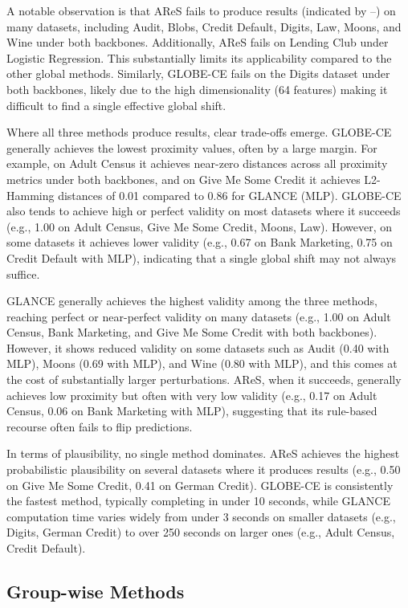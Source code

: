 \documentclass[runningheads]{llncs}
\begin{document}
A notable observation is that AReS fails to produce results (indicated by --) on many datasets, including Audit, Blobs, Credit Default, Digits, Law, Moons, and Wine under both backbones. Additionally, AReS fails on Lending Club under Logistic Regression. This substantially limits its applicability compared to the other global methods. Similarly, GLOBE-CE fails on the Digits dataset under both backbones, likely due to the high dimensionality (64 features) making it difficult to find a single effective global shift.

Where all three methods produce results, clear trade-offs emerge. GLOBE-CE generally achieves the lowest proximity values, often by a large margin. For example, on Adult Census it achieves near-zero distances across all proximity metrics under both backbones, and on Give Me Some Credit it achieves L2-Hamming distances of 0.01 compared to 0.86 for GLANCE (MLP). GLOBE-CE also tends to achieve high or perfect validity on most datasets where it succeeds (e.g., 1.00 on Adult Census, Give Me Some Credit, Moons, Law). However, on some datasets it achieves lower validity (e.g., 0.67 on Bank Marketing, 0.75 on Credit Default with MLP), indicating that a single global shift may not always suffice.

GLANCE generally achieves the highest validity among the three methods, reaching perfect or near-perfect validity on many datasets (e.g., 1.00 on Adult Census, Bank Marketing, and Give Me Some Credit with both backbones). However, it shows reduced validity on some datasets such as Audit (0.40 with MLP), Moons (0.69 with MLP), and Wine (0.80 with MLP), and this comes at the cost of substantially larger perturbations. AReS, when it succeeds, generally achieves low proximity but often with very low validity (e.g., 0.17 on Adult Census, 0.06 on Bank Marketing with MLP), suggesting that its rule-based recourse often fails to flip predictions.

In terms of plausibility, no single method dominates. AReS achieves the highest probabilistic plausibility on several datasets where it produces results (e.g., 0.50 on Give Me Some Credit, 0.41 on German Credit). GLOBE-CE is consistently the fastest method, typically completing in under 10 seconds, while GLANCE computation time varies widely from under 3 seconds on smaller datasets (e.g., Digits, German Credit) to over 250 seconds on larger ones (e.g., Adult Census, Credit Default).



\subsection{Group-wise Methods}
\end{document}
